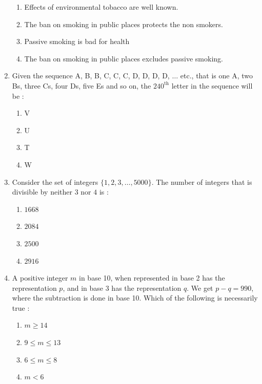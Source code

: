 \documentclass[journal,12pt,onecolumn]{IEEEtran}
\theoremstyle{remark}
\begin{document}
\begin{enumerate}
\hfill{}

\begin{enumerate}
\item Effects of environmental tobacco are well known.
\item The ban on smoking in public places protects the non smokers.
\item Passive smoking is bad for health
\item The ban on smoking in public places excludes passive smoking.
\end{enumerate}

\item Given the sequence A, B, B, C, C, C, D, D, D, D, $\ldots$ etc., that is one A, two Bs, three Cs, four Ds, five Es and so on, the $240^{\text{th}}$ letter in the sequence will be $\colon$
\hfill{}
\begin{multicols}{4}
\begin{enumerate}
\item V
\item U
\item T
\item W
\end{enumerate}
\end{multicols}


\item Consider the set of integers $\{1, 2, 3, \ldots, 5000\}$. The number of integers that is divisible by neither $3$ nor $4$ is $\colon$


\hfill{}

\begin{multicols}{4}
\begin{enumerate}
\item $1668$
\item $2084$
\item $2500$
\item $2916$
\end{enumerate}
\end{multicols}

\item A positive integer $m$ in base 10, when represented in base 2 has the representation $p$, and in base 3 has the representation $q$. We get $p - q = 990$, where the subtraction is done in base 10. Which of the following is necessarily true $\colon$

\hfill{}

\begin{multicols}{4}
\begin{enumerate}
\item \(m \ge 14\)
\item \(9 \le m \le 13\)
\item \(6 \le m \le 8\)
\item \(m < 6\)
\end{enumerate}
\end{multicols}


\end{enumerate}
\end{document}
